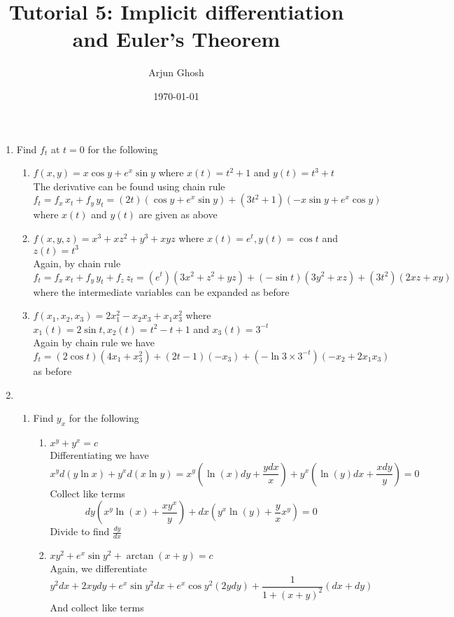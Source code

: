 \documentclass[12pt]{article}
\title{Tutorial 5: Implicit differentiation and Euler's Theorem}
\author{Arjun Ghosh}
\date{\today}
\begin{document}
\maketitle

\begin{enumerate}
\item Find $f_{t}$ at $t=0$ for the following
\begin{enumerate}
\item $f(x,y) = x\cos y +  e^{ x }\sin y$ where $x(t) = t^{2} + 1$ and $y(t) = t^{3} + t$ \\
The derivative can be found using chain rule
$$
f_{t} = f_{x}\,x_{t} + f_{y}\,y_{t} = (2t)(\cos y + e^{ x }\sin y) + (3t^{2} + 1)(-x\sin y + e^{ x }\cos y)
$$
where $x(t)$ and $y(t)$ are given as above
\item $f(x,y,z) = x^{3} + xz^{2} + y^{3} + xyz$ where $x(t) = e^{ t }, y(t) = \cos t$ and $z(t) = t^{3}$ \\
Again, by chain rule
$$
f_{t} = f_{x}\, x_{t} + f_{y}\,y_{t} + f_{z}\,z_{t} = (e^{ t })(3x^{2} + z^{2} + yz) + (-\sin t)(3y^{2} + xz) + (3t^{2})(2xz + xy)
$$
where the intermediate variables can be expanded as before
\item $f(x_{1}, x_{2}, x_{3}) = 2x_{1}^{2} - x_{2}x_{3} + x_{1}x_{3}^{2}$ where $x_{1}(t) = 2\sin t, x_{2}(t)=t^{2} -t + 1$ and $x_{3}(t) = 3^{-t}$ \\
Again by chain rule we have
$$
f_{t} = (2\cos t)(4x_{1} + x_{3}^{2}) + (2t-1)(-x_{3}) + (-\ln 3 \times 3 ^{-t})(-x_{2} + 2x_{1}x_{3})
$$
as before
\end{enumerate}
\item 
\begin{enumerate}
\item Find $y_{x}$ for the following
\begin{enumerate}
\item $x^{y} + y^{x} = c$ \\
Differentiating we have
$$
x^{y} d(y\ln x) + y^{ x}d(x\ln y) = x^{y} \left( \ln (x)dy + \frac{ydx}{x} \right)  +y^{x} \left( \ln (y)dx + \frac{xdy}{y} \right) = 0
$$
Collect like terms
$$
dy \left( x^{y}\ln(x) + \frac{xy^{x}}{y} \right) + dx\left( y^{x}\ln(y) + \frac{y}{x}x^{y} \right) = 0
$$
Divide to find $\frac{dy}{dx}$
\item $xy^{2} + e^{ x }\sin y^{2} + \arctan (x + y) = c$ \\
Again, we differentiate
$$
y^{2}dx + 2xydy + e^{ x }\sin  y^{2}dx + e^{ x } \cos y^{2} (2ydy) + \frac{1}{1 + (x + y)^{2}} (dx + dy)
$$
And collect like terms

\end{enumerate}
\end{enumerate}
\end{enumerate}
\end{document}
